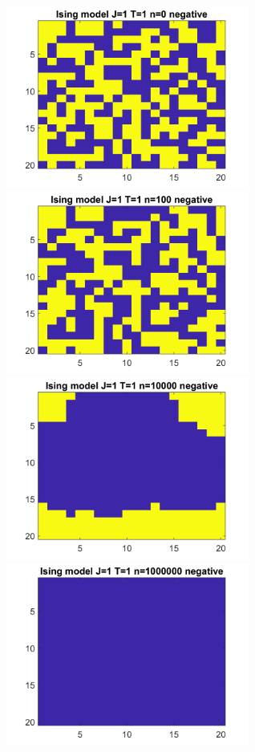 \documentclass[12pt, graphicx]{article}
\begin{document}
\begin{figure}[ht]
\centering
\begin{minipage}{0.48\linewidth}
\centering
\includegraphics[width = 80mm]{st1n0n.png}
\end{minipage}
\begin{minipage}{0.48\linewidth}
\centering
\includegraphics[width = 80mm]{st1n2n.png}
\end{minipage}
\begin{minipage}{0.48\linewidth}
\centering
\includegraphics[width = 80mm]{st1n4n.png}
\end{minipage}
\begin{minipage}{0.48\linewidth}
\centering
\includegraphics[width = 80mm]{st1n6n.png}

\end{minipage}
\end{figure}
\end{document}
